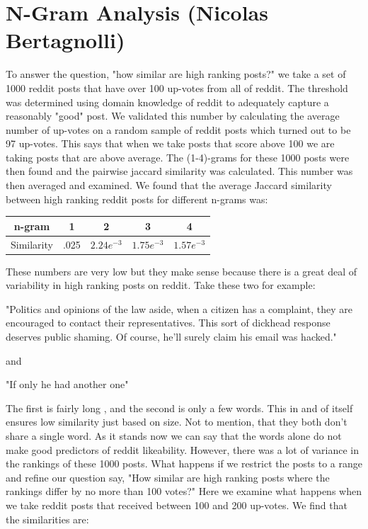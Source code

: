 \documentclass[12pt]{article}
\numberwithin{equation}{section}
\begin{document}
		
\section*{N-Gram Analysis (Nicolas Bertagnolli)}
	To answer the question, "how similar are high ranking posts?" we take a set of 1000 reddit posts that have over 100 up-votes from all of reddit.  The threshold was determined using domain knowledge of reddit to adequately capture a reasonably "good" post.  We validated this number by calculating the average number of up-votes on a random sample of reddit posts which turned out to be 97 up-votes.  This says that when we take posts that score above 100 we are taking posts that are above average.   The (1-4)-grams for these 1000 posts were then found and the pairwise jaccard similarity was calculated.  This number was then averaged and examined.  We found that the average Jaccard similarity between high ranking reddit posts for different n-grams was:\newline
	\begin{table}[h!]
	  \begin{tabular}{c | c c c c}
	  n-gram & 1 & 2 & 3 & 4\\
	  \hline
	  Similarity & .025 & $2.24e^{-3}$ & $1.75e^{-3}$ & $1.57e^{-3}$
	  \end{tabular}
	\end{table}
	
	These numbers are very low but they make sense because there is a great deal of variability in high ranking posts on reddit.  Take these two for example:\newline
	
	"Politics and opinions of the law aside, when a citizen has a complaint, they are encouraged to contact their representatives.  This sort of dickhead response deserves public shaming. Of course, he'll surely claim his email was hacked."\newline
	
	and \newline
	
	"If only he had another one"
	
	The first is fairly long , and the second is only a few words.  This in and of itself ensures low similarity just based on size.  Not to mention, that they both don't share a single word.  As it stands now we can say that the words alone do not make good predictors of reddit likeability.  However, there was a lot of variance in the rankings of these 1000 posts.  What happens if we restrict the posts to a range and refine our question say, "How similar are high ranking posts where the rankings differ by no more than 100 votes?"  Here we examine what happens when we take reddit posts that received between 100 and 200 up-votes.  We find that the similarities are:\newline
	
\end{document}
